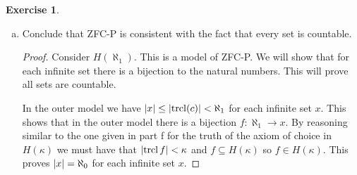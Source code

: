 \documentclass{article}
\theoremstyle{definition}
\newtheorem{question}{Exercise}
\DeclareMathOperator{\trcl}{trcl}
\DeclarePairedDelimiter{\abs}{|}{|}
\begin{document}
\begin{question}
\begin{enumerate}[a.]
        \item Conclude that ZFC-P is consistent with the fact that every set is
              countable.

              \begin{proof}
                  Consider \(H(\aleph_{1})\). This is a model of ZFC-P. We will
                  show that for each infinite set there is a bijection to the
                  natural numbers. This will prove all sets are countable.

                  In the outer model we have
                  \(\abs{x}\leq\abs{\trcl(c)}<\aleph_{1}\) for each infinite set
                  \(x\). This shows that in the outer model there is a bijection
                  \(f:\aleph_{1}\to x\). By reasoning similar to the one given
                  in part f for the truth of the axiom of choice in
                  \(H(\kappa)\) we must have that \(\abs{\trcl{f}}<\kappa\) and
                  \(f\subseteq H(\kappa)\) so \(f\in H(\kappa)\). This proves
                  \(\abs{x}=\aleph_{0}\) for each infinite set \(x\).
              \end{proof}
    \end{enumerate}
\end{question}
\end{document}
